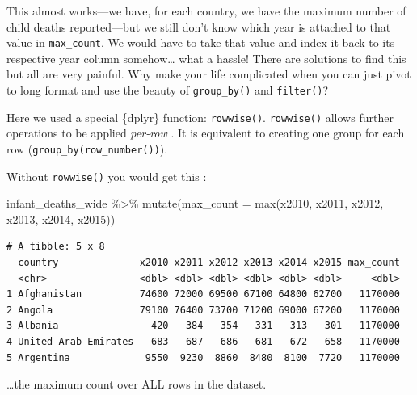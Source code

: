 \documentclass[
  letterpaper,
  DIV=11,
  numbers=noendperiod]{scrreprt}
\newenvironment{Shaded}{\begin{snugshade}}{\end{snugshade}}
\newcommand{\AttributeTok}[1]{\textcolor[rgb]{0.40,0.45,0.13}{#1}}
\newcommand{\FunctionTok}[1]{\textcolor[rgb]{0.28,0.35,0.67}{#1}}
\newcommand{\NormalTok}[1]{\textcolor[rgb]{0.00,0.23,0.31}{#1}}
\newcommand{\SpecialCharTok}[1]{\textcolor[rgb]{0.37,0.37,0.37}{#1}}
\begin{document}
This almost works---we have, for each country, we have the maximum
number of child deaths reported---but we still don't know which year is
attached to that value in \texttt{max\_count}. We would have to take
that value and index it back to its respective year column
somehow\ldots{} what a hassle! There are solutions to find this but all
are very painful. Why make your life complicated when you can just pivot
to long format and use the beauty of \texttt{group\_by()} and
\texttt{filter()}?

\begin{tcolorbox}[enhanced jigsaw, titlerule=0mm, colback=white, left=2mm, breakable, opacitybacktitle=0.6, colbacktitle=quarto-callout-note-color!10!white, colframe=quarto-callout-note-color-frame, bottomtitle=1mm, opacityback=0, coltitle=black, arc=.35mm, toptitle=1mm, title=\textcolor{quarto-callout-note-color}{\faInfo}\hspace{0.5em}{Side Note}, leftrule=.75mm, toprule=.15mm, bottomrule=.15mm, rightrule=.15mm]

Here we used a special \{dplyr\} function: \texttt{rowwise()}.
\texttt{rowwise()} allows further operations to be applied
\emph{per-row} . It is equivalent to creating one group for each row
(\texttt{group\_by(row\_number())}).

Without \texttt{rowwise()} you would get this :

\begin{Shaded}
\begin{Highlighting}[]
\NormalTok{infant\_deaths\_wide }\SpecialCharTok{\%\textgreater{}\%} 
  \FunctionTok{mutate}\NormalTok{(}\AttributeTok{max\_count =} \FunctionTok{max}\NormalTok{(x2010, x2011, x2012, x2013, x2014, x2015))}
\end{Highlighting}
\end{Shaded}

\begin{verbatim}
# A tibble: 5 x 8
  country              x2010 x2011 x2012 x2013 x2014 x2015 max_count
  <chr>                <dbl> <dbl> <dbl> <dbl> <dbl> <dbl>     <dbl>
1 Afghanistan          74600 72000 69500 67100 64800 62700   1170000
2 Angola               79100 76400 73700 71200 69000 67200   1170000
3 Albania                420   384   354   331   313   301   1170000
4 United Arab Emirates   683   687   686   681   672   658   1170000
5 Argentina             9550  9230  8860  8480  8100  7720   1170000
\end{verbatim}

\ldots the maximum count over ALL rows in the dataset.

\end{tcolorbox}
\end{document}
